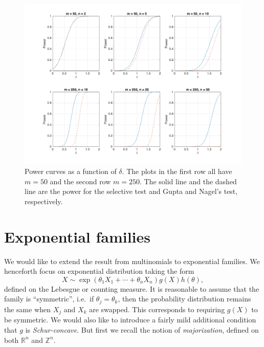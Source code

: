 \documentclass[11pt]{article}
\newcommand{\WFcomment}[1]{{\color{red}{(WF: \bf \sc #1) }}}
\newcommand{\KHcomment}[1]{{\color{green!60!black}{(KH: \bf \sc #1) }}}
\begin{document}
\begin{figure}[htbp]
\begin{center}
\includegraphics[width = \textwidth]{plotMultinomialPower}
\end{center}
\caption{Power curves as a function of $\delta$. The plots in the first row all have $m = 50$ and the second row $m = 250$. The solid line and the dashed line are the power for the selective test and Gupta and Nagel's test, respectively.}
\label{fig:power}
\end{figure}

\section{Exponential families}
\label{sec:exponential_families}

We would like to extend the result from multinomials to exponential families. We henceforth focus on exponential distribution taking the form
\begin{equation}
X \sim \exp\left(\theta_1 X_1 + \cdots + \theta_n X_n\right) g\left(X\right) h\left(\theta\right),
\label{eqn:exp_family}
\end{equation}
defined on the Lebesgue or counting measure. It is reasonable to assume that the family is ``symmetric'', i.e.\ if $\theta_j = \theta_k$, then the probability distribution remains the same when $X_j$ and $X_k$ are swapped. This corresponds to requiring $g\left(X\right)$ to be symmetric. We would also like to introduce a fairly mild additional condition that $g$ is {\em Schur-concave}. But first we recall the notion of {\em majorization}, defined on both $\mathbb{R}^n$ and $\mathbb{Z}^n$. \WFcomment{I think we're implicitly assuming here  that $g$ is a density wrt one of (a) Lebesgue or (b) counting measure. Is that right? And if so, do we need a couple sentences to explain why it works in the counting measure case? That is, we need the atoms of non-zero measure to match up with each other along the rays of interest, right?} \KHcomment{We are making those assumptions. For Lebesgue, there should be no atoms. For counting measure, they should all line up perfectly. I don't think this result generalizes very well for other measures.}
\end{document}
